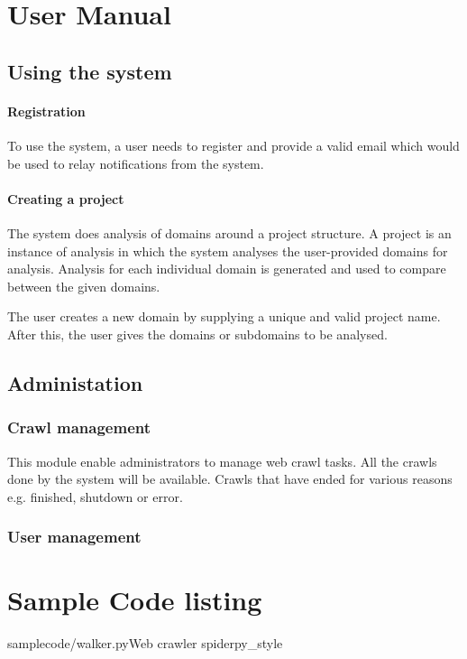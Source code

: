 \appendix
\chapter{User Manual}
\section{Using the system}
\subsubsection{Registration}

\noindent
To use the system, a user needs to register and provide a valid email which would be used to relay notifications from the system.
\subsubsection{Creating a project}

\noindent
The system does analysis of domains around a project structure. A project is an instance of analysis in which the system analyses the user-provided domains for analysis. Analysis for each individual domain is generated and used to compare between the given domains. 

\noindent
The user creates a new domain by supplying a unique and valid project name. After this, the user gives the domains or subdomains to be analysed.

\section{Administation}

\subsection{Crawl management}
\noindent
This module enable administrators to manage web crawl tasks. All the crawls done by the system will be available. Crawls that have ended for various reasons e.g. finished, shutdown or error. 

\subsection{User management}

\chapter{Sample Code listing}
	\begin{codesnippet}{samplecode/walker.py}{Web crawler spider}{py_style}
	\end{codesnippet}
